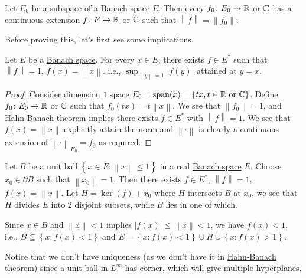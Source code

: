\begin{theorem}\label{thm:Hahn-Banach}
	Let \(E_0\) be a subspace of a \hyperref[def:Banach-space]{Banach space} \(E\). Then every \(f_0 \colon E_0 \to \mathbb{\MakeUppercase{r}} \) or \(\mathbb{\MakeUppercase{c}} \) has a continuous extension \(f\colon E\to \mathbb{\MakeUppercase{r}} \) or \(\mathbb{\MakeUppercase{c}} \) such that \(\left\lVert f\right\rVert = \left\lVert f_0\right\rVert.\)
\end{theorem}

Before proving this, let's first see some implications.

\begin{theorem}\label{thm:supporting-functional}
	Let \(E\) be a \hyperref[def:Banach-space]{Banach space}. For every \(x\in E\), there exists \(f\in E^{\ast} \)  such that \(\left\lVert f\right\rVert = 1\), \(f(x) = \left\lVert x\right\rVert \). i.e., \(\sup _{\left\lVert y\right\rVert = 1} \left\vert f(y) \right\vert \) attained at \(y = x\).
\end{theorem}
\begin{proof}
	Consider dimension \(1\) space \(E_0 = \mathop{\mathrm{span}}(x) = \left\{ tx,t\in \mathbb{\MakeUppercase{r}} \text{ or }\mathbb{\MakeUppercase{c}}   \right\} \). Define \(f_0\colon E_0 \to \mathbb{\MakeUppercase{r}} \) or \(\mathbb{\MakeUppercase{c}} \) such that \(f_0(tx) = t \left\lVert x\right\rVert \). We see that \(\left\lVert f_0\right\rVert = 1\), and \hyperref[thm:Hahn-Banach]{Hahn-Banach theorem} implies there exists \(f\in E^{\ast} \) with \(\left\lVert f\right\rVert = 1\). We see that \(f(x) = \left\lVert x\right\rVert \) explicitly attain the \hyperref[def:norm]{norm} and \(\left\lVert \cdot \right\rVert \) is clearly a continuous extension of \(\left\lVert \cdot \right\rVert _{E_0}= f_0\) as required.
\end{proof}

\begin{remark}
	Let \(B\) be a unit ball \(\left\{ x\in E \colon \left\lVert x\right\rVert \leq 1\right\} \) in a real \hyperref[def:Banach-space]{Banach space} \(E\). Choose \(x_0 \in \partial B\) such that \(\left\lVert x_0\right\rVert = 1\). Then there exists \(f\in E^{\ast} \), \(\left\lVert f\right\rVert = 1\), \(f(x) = \left\lVert x\right\rVert \). Let \(H = \ker(f) + x_0\) where \(H\) intersects \(B\) at \(x_0\), we see that \(H\) divides \(E\) into \(2\) disjoint subsets, while \(B\) lies in one of which.
\end{remark}
\begin{explanation}
	Since \(x\in B\) and \(\left\lVert x\right\rVert < 1\) implies \(\left\vert f(x) \right\vert \leq \left\lVert x\right\rVert < 1\), we have \(f(x) < 1\), i.e., \(B\subseteq \left\{ x\colon f(x) < 1 \right\} \) and \(E = \left\{ x\colon f(x) < 1 \right\} \cup H \cup \left\{ x\colon f(x) > 1 \right\}\).
\end{explanation}

\begin{note}
	Notice that we don't have uniqueness (as we don't have it in \hyperref[thm:Hahn-Banach]{Hahn-Banach theorem}) since a unit \hyperref[def:ball]{ball} in \(L^{\infty } \) has corner, which will give multiple \hyperref[def:hyperplane]{hyperplanes}.
\end{note}
